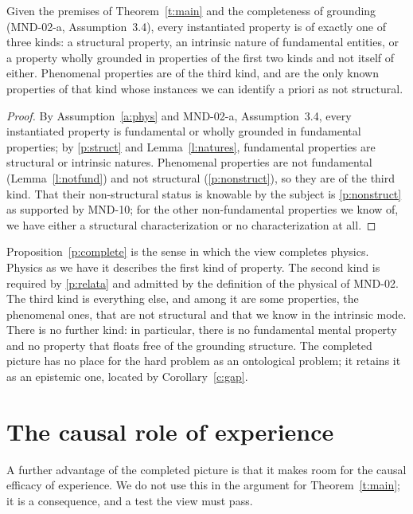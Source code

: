 \documentclass{situationist-preprint}
\begin{document}
\begin{proposition}\label{p:complete}
Given the premises of Theorem~\ref{t:main} and the completeness of grounding (MND-02-a, Assumption~3.4), every instantiated property is of exactly one of three kinds: a structural property, an intrinsic nature of fundamental entities, or a property wholly grounded in properties of the first two kinds and not itself of either. Phenomenal properties are of the third kind, and are the only known properties of that kind whose instances we can identify a priori as not structural.
\end{proposition}

\begin{proof}
By Assumption~\ref{a:phys} and MND-02-a, Assumption~3.4, every instantiated property is fundamental or wholly grounded in fundamental properties; by \ref{p:struct} and Lemma~\ref{l:natures}, fundamental properties are structural or intrinsic natures. Phenomenal properties are not fundamental (Lemma~\ref{l:notfund}) and not structural (\ref{p:nonstruct}), so they are of the third kind. That their non-structural status is knowable by the subject is \ref{p:nonstruct} as supported by MND-10; for the other non-fundamental properties we know of, we have either a structural characterization or no characterization at all.
\end{proof}

Proposition~\ref{p:complete} is the sense in which the view completes physics. Physics as we have it describes the first kind of property. The second kind is required by \ref{p:relata} and admitted by the definition of the physical of MND-02. The third kind is everything else, and among it are some properties, the phenomenal ones, that are not structural and that we know in the intrinsic mode. There is no further kind: in particular, there is no fundamental mental property and no property that floats free of the grounding structure. The completed picture has no place for the hard problem as an ontological problem; it retains it as an epistemic one, located by Corollary~\ref{c:gap}.

\section{The causal role of experience}\label{s:causal}

A further advantage of the completed picture is that it makes room for the causal efficacy of experience. We do not use this in the argument for Theorem~\ref{t:main}; it is a consequence, and a test the view must pass.
\end{document}
